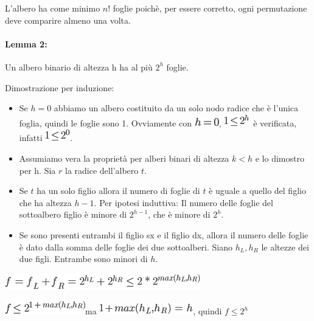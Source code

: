 \documentclass{article}
\providecommand{\tightlist}{%
  \setlength{\itemsep}{0pt}\setlength{\parskip}{0pt}}
\let\oldparagraph\paragraph
\renewcommand{\paragraph}[1]{\oldparagraph{#1}\mbox{}}
\begin{document}
{{L'albero ha come minimo $n!$ foglie poichè, per essere corretto, ogni permutazione deve comparire almeno una volta.}

\hypertarget{h.yiy1tipj4aof}{\paragraph{\texorpdfstring{{Lemma 2:}}{Lemma 2:}}\label{h.yiy1tipj4aof}}

{Un albero binario di altezza h ha al più $2^h$ foglie.}

{Dimostrazione per induzione:}

\begin{itemize}
\tightlist
\item
  {Se $h=0$ abbiamo un albero
  costituito da un solo nodo radice che è l'unica foglia, quindi le
  foglie sono 1. Ovviamente con }\includegraphics{images/image162.png}{,
  }\includegraphics{images/image163.png}{~è verificata, infatti
  }\includegraphics{images/image164.png}{.}
\item
  {Assumiamo vera la proprietà per alberi binari di altezza $k<h$ e lo dimostro per h. Sia $r$ la radice dell'albero $t$. }
\end{itemize}

\begin{itemize}
\tightlist
\item
  {Se $t$ ha un solo figlio allora il numero di foglie di $t$ è uguale a quello del figlio che ha altezza $h-1$. }{Per ipotesi induttiva}{: Il numero delle foglie del sottoalbero figlio è minore di $2^{h-1}$, che è minore di $2^h$.}
\item
  {Se sono presenti entrambi il figlio sx e il figlio dx, allora il numero delle foglie è dato dalla somma delle foglie dei due sottoalberi. Siano $h_L,h_R$ le altezze
  dei due figli. Entrambe sono minori di $h$.}
\end{itemize}

\includegraphics{images/image169.png}

\includegraphics{images/image170.png}{ma
}\includegraphics{images/image171.png}{, quindi
}$f \leq 2^h$

}
\end{document}
